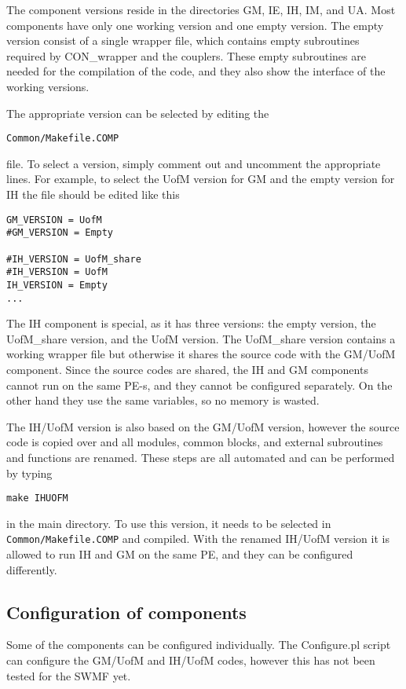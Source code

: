 The component versions reside in the directories GM, IE, IH, IM, and UA.
Most components have only one working version and one empty version.
The empty version consist of a single wrapper file, which contains 
empty subroutines required by CON\_wrapper and the couplers.
These empty subroutines are needed for the compilation of the code,
and they also show the interface of the working versions.

The appropriate version can be selected by editing the
\begin{verbatim}
Common/Makefile.COMP
\end{verbatim}
file. To select a version, simply comment out and uncomment the
appropriate lines. For example, to select the UofM version
for GM and the empty version for IH the file should be edited 
like this
\begin{verbatim}
GM_VERSION = UofM
#GM_VERSION = Empty

#IH_VERSION = UofM_share
#IH_VERSION = UofM
IH_VERSION = Empty
...
\end{verbatim}
The IH component is special, as it has three versions: the empty version,
the UofM\_share version, and the UofM version. The UofM\_share version
contains a working wrapper file but otherwise it shares the source code
with the GM/UofM component. Since the source codes are shared, the
IH and GM components cannot run on the same PE-s, and they cannot be
configured separately. On the other hand they use the same variables,
so no memory is wasted.

The IH/UofM version is also based on the GM/UofM version, however
the source code is copied over and all modules, common blocks,
and external subroutines and functions are renamed. 
These steps are all automated and can be performed by typing
\begin{verbatim}
make IHUOFM
\end{verbatim}
in the main directory. To use this version, it needs to be selected
in {\tt Common/Makefile.COMP} and compiled. With the renamed
IH/UofM version it is allowed to run IH and GM on the same PE,
and they can be configured differently.

\subsection{Configuration of components}

Some of the components can be configured individually. 
The Configure.pl script can configure the GM/UofM and IH/UofM codes,
however this has not been tested for the SWMF yet. 


